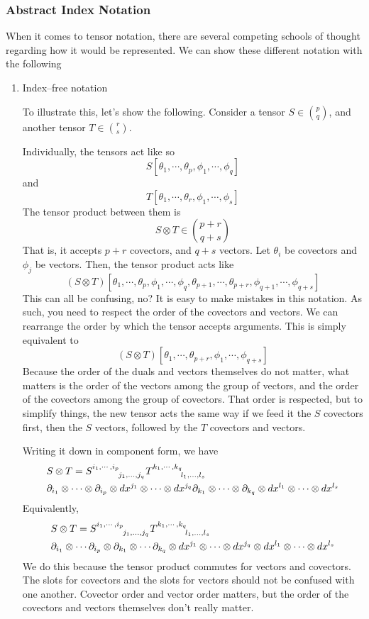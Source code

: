 \subsubsection{Abstract Index Notation}
	When it comes to tensor notation, there are several competing schools of thought
	regarding how it would be represented. We can show these 
	different notation with the following
	\begin{enumerate}[(1)]
		\item Index--free notation

			To illustrate this, let's show the following. Consider a tensor $S\in\binom{p}{q}$, and 
			another tensor $T\in\binom{r}{s}$. 

			Individually, the tensors act like so
			\[
				S[\theta_1,\cdots,\theta_p,\phi_1,\cdots,\phi_q]
			\]
			and
			\[
				T[\theta_1,\cdots,\theta_r,\phi_1,\cdots,\phi_s]
			\]
			The tensor product
			between them is
			\[
				S\otimes T \in \binom{p+r}{q+s}
			\]
			That is, it accepts $p+r$ covectors, and $q+s$ vectors. Let $\theta_i$ be covectors and 
			$\phi_j$ be vectors. 
			Then, the tensor product acts like
			\[
				(S\otimes T)[\theta_1,\cdots, \theta_{p},\phi_1,\cdots,\phi_q,\theta_{p+1},\cdots,\theta_{p+r},\phi_{q+1},\cdots,\phi_{q+s}]
			\]
			This can all be confusing, no? It is easy to make mistakes in this notation. As such, 
			you need to respect the order of the covectors and vectors. 
			We can rearrange the order by which the tensor accepts arguments. This is simply equivalent to
			\[
				(S\otimes T)[\theta_1,\cdots, \theta_{p+r}, \phi_1, \cdots, \phi_{q+s}]
			\]
			Because the order of the duals and vectors themselves do not matter, what matters is 
			the order of the vectors among the group of vectors, and the order of the covectors among the 
			group of covectors. That order is respected, but to simplify things, the new tensor acts the same way
			if we feed it the $S$ covectors first, then the $S$ vectors, followed by the $T$ covectors and vectors. 

			Writing it down in component form, we have
			\begin{align*}
				&S\otimes T =
				\tensor{S}{^{i_1,\cdots,i_p}_{j_1,\dots,j_q}}
				\tensor{T}{^{k_1,\cdots,k_q}_{l_1,\dots,l_s}}\\
						   &\p_{i_1}\otimes\cdots\otimes\p_{i_p}\otimes dx^{j_1}\otimes\cdots\otimes dx^{j_q}
				\p_{k_1}\otimes\cdots\otimes\p_{k_q}\otimes dx^{l_1}\otimes\cdots\otimes dx^{l_s}
			\end{align*}
			Equivalently,
			\begin{align*}
				&S\otimes T =
				\tensor{S}{^{i_1,\cdots,i_p}_{j_1,\dots,j_q}}
				\tensor{T}{^{k_1,\cdots,k_q}_{l_1,\dots,l_s}}\\
						   &\p_{i_1}\otimes\cdots\p_{i_p}\otimes
				\p_{k_1}\otimes\cdots\p_{k_q}\otimes
				dx^{j_1}\otimes\cdots\otimes dx^{j_q}\otimes
				dx^{l_1}\otimes\cdots\otimes dx^{l_s}
			\end{align*}
			We do this because the tensor product commutes for vectors and covectors.
			The slots for covectors and the slots for vectors should not be confused with 
			one another. Covector order and vector order matters, but the order of the covectors and vectors themselves don't really matter.


\end{enumerate}
